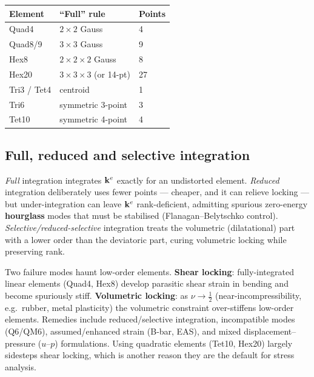 \begin{center}
\begin{tabularx}{\linewidth}{lXl}
  \toprule
  Element & ``Full'' rule & Points \\
  \midrule
  Quad4      & $2\times2$ Gauss           & 4 \\
  Quad8/9    & $3\times3$ Gauss           & 9 \\
  Hex8       & $2\times2\times2$ Gauss    & 8 \\
  Hex20      & $3\times3\times3$ (or 14-pt)& 27 \\
  Tri3 / Tet4& centroid                   & 1 \\
  Tri6       & symmetric 3-point          & 3 \\
  Tet10      & symmetric 4-point          & 4 \\
  \bottomrule
\end{tabularx}
\end{center}

\subsection{Full, reduced and selective integration}

\emph{Full} integration integrates $\mathbf{k}^{e}$ exactly for an undistorted
element. \emph{Reduced} integration deliberately uses fewer points ---
cheaper, and it can relieve locking --- but under-integration can leave
$\mathbf{k}^{e}$ rank-deficient, admitting spurious zero-energy
\textbf{hourglass} modes that must be stabilised (Flanagan--Belytschko
control). \emph{Selective/reduced-selective} integration treats the
volumetric (dilatational) part with a lower order than the deviatoric
part, curing volumetric locking while preserving rank.

\begin{remark}
Two failure modes haunt low-order elements. \textbf{Shear locking}:
fully-integrated linear elements (Quad4, Hex8) develop parasitic shear
strain in bending and become spuriously stiff. \textbf{Volumetric
locking}: as $\nu\to\tfrac12$ (near-incompressibility, e.g.\ rubber,
metal plasticity) the volumetric constraint over-stiffens low-order
elements. Remedies include reduced/selective integration, incompatible
modes (Q6/QM6), assumed/enhanced strain (B-bar, EAS), and mixed
displacement--pressure ($u$--$p$) formulations. Using quadratic elements
(Tet10, Hex20) largely sidesteps shear locking, which is another reason
they are the default for stress analysis.
\end{remark}

